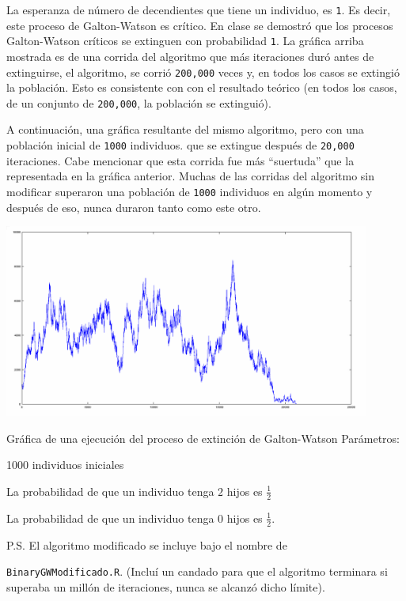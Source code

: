 La esperanza de número de decendientes que tiene un individuo, es \texttt{1}. Es decir,
este proceso de Galton-Watson es crítico. En clase se demostró que los procesos Galton-Watson
críticos se extinguen con probabilidad \texttt{1}. La gráfica arriba mostrada es de una corrida
del algoritmo que más iteraciones duró antes de extinguirse, el algoritmo, se corrió
\texttt{200,000} veces y, en todos los casos se extingió la población. Esto es consistente con
con el resultado teórico (en todos los casos, de un conjunto de \texttt{200,000}, la población se extinguió).\par\null

A continuación, una gráfica resultante del mismo algoritmo, pero con una población inicial de \texttt{1000} individuos.
que se extingue después de \texttt{20,000} iteraciones. Cabe mencionar que esta corrida fue más ``suertuda'' que la
representada en la gráfica anterior. Muchas de las corridas del algoritmo sin modificar superaron una población de
\texttt{1000} individuos en algún momento y después de eso, nunca duraron tanto como este otro.

\begin{center}
    \includegraphics[width=12cm]{tarea3/problema3_4/galtonWatsonEmpezandoEn1000.PNG}
    
    Gr\'afica de una ejecuci\'on del proceso de extinci\'on de Galton-Watson 
    Par\'ametros:\par 
    1000 individuos iniciales \par
    La probabilidad de que un individuo tenga $2$ hijos es $\frac{1}{2}$ \par
    La probabilidad de que un individuo tenga $0$ hijos es $\frac{1}{2}$.\par\null
\end{center}

P.S. El algoritmo modificado se incluye bajo el nombre de \par
\texttt{BinaryGWModificado.R}. (Incluí un candado para que el algoritmo terminara si 
superaba un millón de iteraciones, nunca se alcanzó dicho límite).